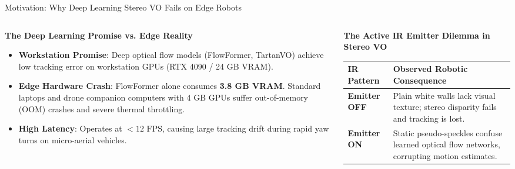 \documentclass[aspectratio=169, 10pt]{beamer}
\begin{document}
\begin{frame}{Motivation: Why Deep Learning Stereo VO Fails on Edge Robots}
  \begin{columns}[T]
    \begin{column}{0.48\textwidth}
      {\normalsize \textbf{\textcolor{NavyBlue}{The Deep Learning Promise vs. Edge Reality}}}
      \vspace{0.2cm}
      \begin{itemize}
        \setlength{\itemsep}{5pt}
        \item \textbf{Workstation Promise}: Deep optical flow models (FlowFormer, TartanVO) achieve low tracking error on workstation GPUs (RTX 4090 / 24 GB VRAM).
        \item \textbf{Edge Hardware Crash}: FlowFormer alone consumes \textbf{3.8 GB VRAM}. Standard laptops and drone companion computers with 4 GB GPUs suffer out-of-memory (OOM) crashes and severe thermal throttling.
        \item \textbf{High Latency}: Operates at $<12\text{ FPS}$, causing large tracking drift during rapid yaw turns on micro-aerial vehicles.
      \end{itemize}
    \end{column}

    \begin{column}{0.48\textwidth}
      {\normalsize \textbf{\textcolor{NavyBlue}{The Active IR Emitter Dilemma in Stereo VO}}}
      \vspace{0.2cm}
      
      \renewcommand{\arraystretch}{1.2}
      \begin{tabular}{p{2.3cm} p{4.0cm}}
        \toprule
        \textbf{IR Pattern} & \textbf{Observed Robotic Consequence} \\
        \midrule
        \textbf{Emitter OFF} & Plain white walls lack visual texture; stereo disparity fails and tracking is lost. \\
        \textbf{Emitter ON} & Static pseudo-speckles confuse learned optical flow networks, corrupting motion estimates. \\
        \bottomrule
      \end{tabular}
      \vspace{0.35cm}


\end{column}
\end{columns}
\end{frame}
\end{document}
